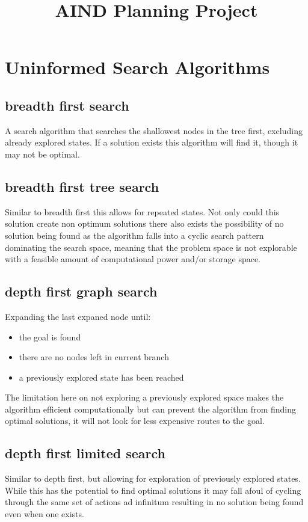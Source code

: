 \documentclass[11pt]{article}
\title{\textbf{AIND Planning Project}}
\begin{document}
\maketitle

\newpage


\section{Uninformed Search Algorithms}

\subsection{breadth first search}
A search algorithm that searches the shallowest nodes in the tree first, excluding already explored states.
If a solution exists this algorithm will find it, though it may not be optimal.

\subsection{breadth first tree search}
Similar to breadth first this allows for repeated states.	
Not only could this solution create non optimum solutions there also exists the possibility of no solution being found as the algorithm falls into a cyclic search pattern dominating the search space, meaning that the problem space is not explorable with a feasible amount of computational power and/or storage space.

\subsection{depth first graph search}
Expanding the last expaned node until:
\begin{itemize}
	\item the goal is found
	\item there are no nodes left in current branch
	\item a previously explored state has been reached
\end{itemize} 
The limitation here on not exploring a previously explored space makes the algorithm efficient computationally but can prevent the algorithm from finding optimal solutions, it will not look for less expensive routes to the goal.

\subsection{depth first limited search}
Similar to depth first, but allowing for exploration of previously explored states. While this has the potential to find optimal solutions it may fall afoul of cycling through the same set of actions ad infinitum resulting in no solution being found even when one exists.
\end{document}
